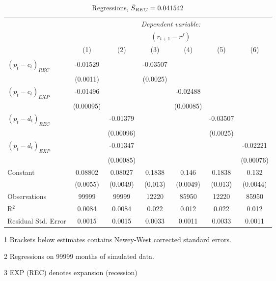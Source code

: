 \begin{table}[H]
\centering
  \caption{Regressions, $\Bar{S}_{REC} = 0.041542$}
  \label{tab:regress1}
  \begin{threeparttable}
\begin{tabular}{@{\hspace{5pt}}l@{\hspace{5pt}}cccccc}
\toprule
 & \multicolumn{6}{c}{\textit{Dependent variable:}} \\
 & \multicolumn{6}{c}{$\left(r_{t+1}-r^f\right)$} \\
 \cmidrule(rr){2-7}
 & (1) & (2) & (3) & (4) & (5) & (6) \\
\midrule
\\[-2.1ex] $\left( p_t - c_t \right)_{REC}$ &-0.01529& &-0.03507 & & &\\
  & (0.0011) & &(0.0025) & & & \\
 \addlinespace
  $\left( p_t - c_t \right)_{EXP}$ &-0.01496  &    & &-0.02488 & &  \\
  & (0.00095) & & &(0.00085) & & \\
 \addlinespace
  $\left( p_t - d_t \right)_{REC}$ & &-0.01379& & & -0.03507  &   \\
                                   & &  (0.00096) & & & (0.0025) &    \\
 \addlinespace
  $\left( p_t - d_t \right)_{EXP}$ & &   -0.01347& & & &-0.02221 \\
                                   & &  (0.00085) & & & &(0.00076) \\
 \addlinespace
 Constant &0.08802 &0.08027&0.1838 &0.146 &0.1838 &0.132 \\
          &(0.0055) &(0.0049)&(0.013)&(0.0049)&(0.013)&(0.0044) \\
 \addlinespace
\midrule
Observations & 99999 & 99999&12220 & 85950&12220&85950\\
R$^{2}$ &0.0084 & 0.0084&0.022&0.012&0.022&0.012 \\
Residual Std. Error &0.0015 & 0.0015&0.0033&0.0011&0.0033&0.0011 \\
\bottomrule
\end{tabular}
\begin{tablenotes}
\footnotesize{
\item[1] Brackets below estimates contains Newey-West corrected standard errors.
\item[2] Regressions on 99999 months of simulated data.
\item[3] EXP (REC) denotes expansion (recession)
}
\end{tablenotes}
\end{threeparttable}
\end{table}
